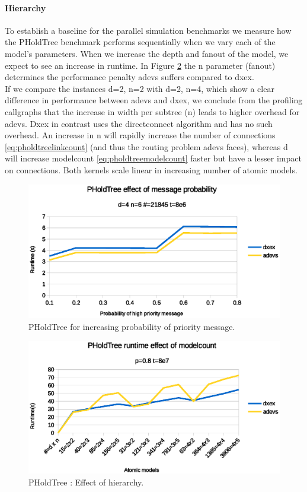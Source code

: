 \paragraph*{Hierarchy}
To establish a baseline for the parallel simulation benchmarks we measure how the PHoldTree benchmark performs sequentially when we vary each of the model's parameters. 
When we increase the depth and fanout of the model, we expect to see an increase in runtime. In Figure \ref{fig:PHoldtree_seq_dn_benchmark} the n parameter (fanout) determines the performance penalty adevs suffers compared to dxex.\\
If we compare the instances d=2, n=2 with d=2, n=4, which show a clear difference in performance between adevs and dxex, we conclude from the profiling callgraphs that the increase in width per subtree (n) leads to higher overhead for adevs. Dxex in contrast uses the directconnect algorithm and has no such overhead. An increase in n will rapidly increase the number of connections \ref{eq:pholdtreelinkcount} (and thus the routing problem adevs faces), whereas d will increase modelcount \ref{eq:pholdtreemodelcount} faster but have a lesser impact on connections. Both kernels scale linear in increasing number of atomic models. 
\begin{figure}
	\center
	\includegraphics[width=\plotfraction\columnwidth]{fig/pholdtree_sequential_p.eps}
	\caption{PHoldTree for increasing probability of priority message.}
	\label{fig:PHoldtree_seq_p_benchmark}
\end{figure}
\begin{figure}
	\center
	\includegraphics[width=\plotfraction\columnwidth]{fig/pholdtree_sequential_dn.eps}
	\caption{PHoldTree : Effect of hierarchy.}
	\label{fig:PHoldtree_seq_dn_benchmark}
\end{figure}